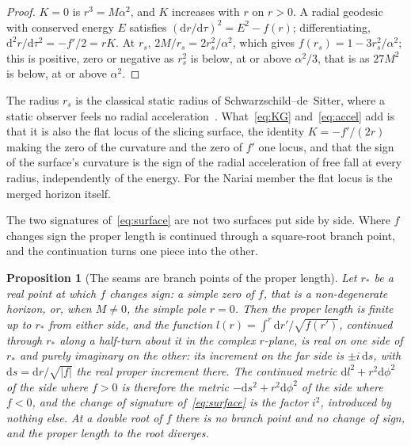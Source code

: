 \documentclass[11pt]{article}
\theoremstyle{plain}
\newtheorem{proposition}[theorem]{Proposition}
\theoremstyle{definition}
\theoremstyle{remark}
\newcommand{\dd}{\mathrm{d}}
\begin{document}
\begin{proof}
$K=0$ is $r^{3}=M\alpha^{2}$, and $K$ increases with $r$ on $r>0$. A radial geodesic with conserved energy $E$
satisfies $(\dd r/\dd\tau)^{2}=E^{2}-f(r)$; differentiating, $\dd^{2}r/\dd\tau^{2}=-f'/2=rK$. At $r_{s}$,
$2M/r_{s}=2r_{s}^{2}/\alpha^{2}$, which gives $f(r_{s})=1-3r_{s}^{2}/\alpha^{2}$; this is positive, zero or negative as
$r_{s}^{2}$ is below, at or above $\alpha^{2}/3$, that is as $27M^{2}$ is below, at or above $\alpha^{2}$.
\end{proof}

The radius $r_{s}$ is the classical static radius of Schwarzschild--de~Sitter, where a static observer feels no
radial acceleration~\cite{StuchlikHledik1999}. What~\eqref{eq:KG} and~\eqref{eq:accel} add is that it is also the
flat locus of the slicing surface, the identity $K=-f'/(2r)$ making the zero of the curvature and the zero of
$f'$ one locus, and that the sign of the surface's curvature is the sign of the radial acceleration of free fall
at every radius, independently of the energy. For the Nariai member the flat locus is the merged horizon itself.

The two signatures of~\eqref{eq:surface} are not two surfaces put side by side. Where $f$ changes sign the proper
length is continued through a square-root branch point, and the continuation turns one piece into the other.

\begin{proposition}[The seams are branch points of the proper length]\label{prop:seam}
Let $r_{*}$ be a real point at which $f$ changes sign: a simple zero of $f$, that is a non-degenerate horizon,
or, when $M\neq0$, the simple pole $r=0$. Then the proper length is finite up to $r_{*}$ from either side, and
the function $l(r)=\int^{r}\dd r'/\sqrt{f(r')}$, continued through $r_{*}$ along a half-turn about it in the complex
$r$-plane, is real on one side of $r_{*}$ and purely imaginary on the other: its increment on the far side is
$\pm i\,\dd s$, with $\dd s=\dd r/\sqrt{|f|}$ the real proper increment there. The continued metric
$\dd l^{2}+r^{2}\dd\phi^{2}$ of the side where $f>0$ is therefore the metric $-\dd s^{2}+r^{2}\dd\phi^{2}$ of the side
where $f<0$, and the change of signature of~\eqref{eq:surface} is the factor $i^{2}$, introduced by nothing
else. At a double root of $f$ there is no branch point and no change of sign, and the proper length to the
root diverges.
\end{proposition}
\end{document}
